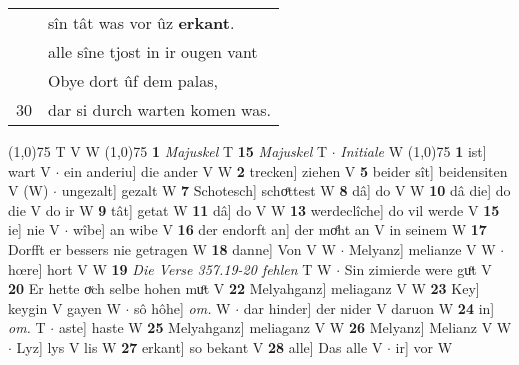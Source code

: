 \documentclass[8pt,a4paper,notitlepage]{article}
\begin{document}
\begin{table}[ht]
\begin{minipage}[t]{0.5\linewidth}
\begin{tabular}{rl}
 & sîn tât was vor ûz \textbf{erkant}.\\ 
 & alle sîne tjost in ir ougen vant\\ 
 & Obye dort ûf dem palas,\\ 
30 & dar si durch warten komen was.\\ 
\end{tabular}
\scriptsize
\line(1,0){75} \newline
T V W \newline
\line(1,0){75} \newline
\textbf{1} \textit{Majuskel} T  \textbf{15} \textit{Majuskel} T   $\cdot$ \textit{Initiale} W  \newline
\line(1,0){75} \newline
\textbf{1} ist] wart V  $\cdot$ ein anderiu] die ander V W \textbf{2} trecken] ziehen V \textbf{5} beider sît] beidensiten V (W)  $\cdot$ ungezalt] gezalt W \textbf{7} Schotesch] schoͤttest W \textbf{8} dâ] do V W \textbf{10} dâ die] do die V do ir W \textbf{9} tât] getat W \textbf{11} dâ] do V W \textbf{13} werdeclîche] do vil werde V \textbf{15} ie] nie V  $\cdot$ wîbe] an wibe V \textbf{16} der endorft an] der moͤht an V in seinem W \textbf{17} Dorfft er bessers nie getragen W \textbf{18} danne] Von V W  $\cdot$ Melyanz] melianze V W  $\cdot$ hœre] hort V W \textbf{19} \textit{Die Verse 357.19-20 fehlen} T W   $\cdot$ Sin zimierde were guͦt V \textbf{20} Er hette oͮch selbe hohen muͦt V \textbf{22} Melyahganz] meliaganz V W \textbf{23} Key] keygin V gayen W  $\cdot$ sô hôhe] \textit{om.} W  $\cdot$ dar hinder] der nider V daruon W \textbf{24} in] \textit{om.} T  $\cdot$ aste] haste W \textbf{25} Melyahganz] meliaganz V W \textbf{26} Melyanz] Melianz V W  $\cdot$ Lyz] lys V lis W \textbf{27} erkant] so bekant V \textbf{28} alle] Das alle V  $\cdot$ ir] vor W \newline
\end{minipage}
\end{table}
\end{document}
